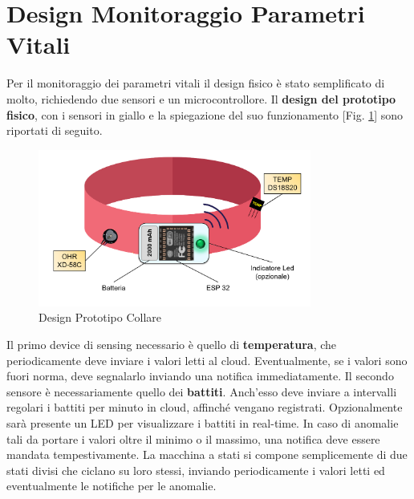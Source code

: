 \section{Design Monitoraggio Parametri Vitali}
Per il monitoraggio dei parametri vitali il design fisico è stato semplificato di molto, richiedendo due sensori e un microcontrollore. Il \textbf{design del prototipo fisico}, con i sensori in giallo e la spiegazione del suo funzionamento [Fig. \ref{fig:collare}] sono riportati di seguito.
    \begin{figure}[H]
        \caption{Design Prototipo Collare}
        \label{fig:collare}
        \centering
        \includegraphics[width=0.8\textwidth]{Images/collare.png}
    \end{figure}
Il primo device di sensing necessario è quello di \textbf{temperatura}, che periodicamente deve inviare i valori letti al cloud. Eventualmente, se i valori sono fuori norma, deve segnalarlo inviando una notifica immediatamente.
Il secondo sensore è necessariamente quello dei \textbf{battiti}. Anch'esso deve inviare a intervalli regolari i battiti per minuto in cloud, affinché vengano registrati. Opzionalmente sarà presente un LED per visualizzare i battiti in real-time. In caso di anomalie tali da portare i valori oltre il minimo o il massimo, una notifica deve essere mandata tempestivamente. 
La macchina a stati si compone semplicemente di due stati divisi che ciclano su loro stessi, inviando periodicamente i valori letti ed eventualmente le notifiche per le anomalie.
    
